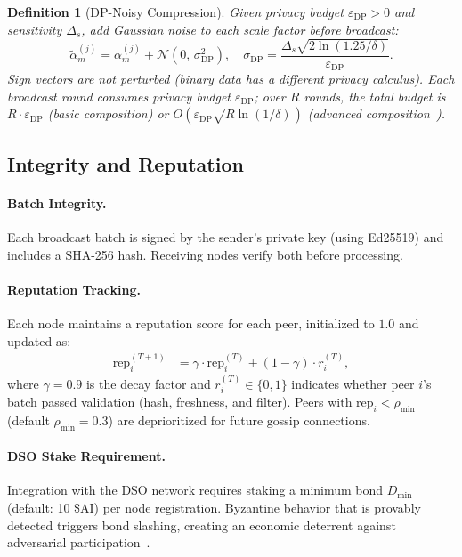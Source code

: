 \documentclass[11pt]{article}
\newtheorem{definition}{Definition}
\begin{document}
\begin{definition}[DP-Noisy Compression]
\label{def:dp-noise}
Given privacy budget $\varepsilon_{\text{DP}} > 0$ and sensitivity $\Delta_s$,
add Gaussian noise to each scale factor before broadcast:
\begin{equation}
    \tilde{\alpha}_m^{(j)} = \alpha_m^{(j)} + \mathcal{N}\!\left(0, \, \sigma_{\text{DP}}^2\right),
    \quad \sigma_{\text{DP}} = \frac{\Delta_s \sqrt{2 \ln(1.25/\delta)}}{\varepsilon_{\text{DP}}}.
\end{equation}
Sign vectors are not perturbed (binary data has a different privacy calculus).
Each broadcast round consumes privacy budget $\varepsilon_{\text{DP}}$;
over $R$ rounds, the total budget is $R \cdot \varepsilon_{\text{DP}}$ (basic
composition) or $O(\varepsilon_{\text{DP}} \sqrt{R \ln(1/\delta)})$ (advanced
composition~\cite{dwork2014algorithmic}).
\end{definition}

\subsection{Integrity and Reputation}

\paragraph{Batch Integrity.}
Each broadcast batch is signed by the sender's private key (using Ed25519)
and includes a SHA-256 hash. Receiving nodes verify both before processing.

\paragraph{Reputation Tracking.}
Each node maintains a reputation score for each peer, initialized to $1.0$
and updated as:
\begin{align}
    \text{rep}^{(T+1)}_i &= \gamma \cdot \text{rep}^{(T)}_i + (1 - \gamma) \cdot r_i^{(T)},
    \label{eq:reputation}
\end{align}
where $\gamma = 0.9$ is the decay factor and $r_i^{(T)} \in \{0, 1\}$
indicates whether peer $i$'s batch passed validation (hash, freshness, and
filter). Peers with $\text{rep}_i < \rho_{\min}$ (default $\rho_{\min} = 0.3$)
are deprioritized for future gossip connections.

\paragraph{DSO Stake Requirement.}
Integration with the DSO network requires staking a minimum bond $D_{\min}$
(default: 10 \$AI) per node registration. Byzantine behavior that is
provably detected triggers bond slashing, creating an economic deterrent
against adversarial participation~\cite{hanzo2026dso}.
\end{document}
